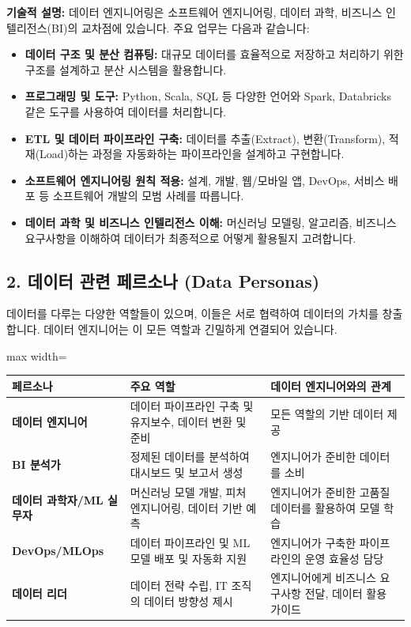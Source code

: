 \documentclass[11pt,a4paper]{article}
\begin{document}
\textbf{기술적 설명:}
데이터 엔지니어링은 소프트웨어 엔지니어링, 데이터 과학, 비즈니스 인텔리전스(BI)의 교차점에 있습니다.
주요 업무는 다음과 같습니다:
\begin{itemize}
    \item \textbf{데이터 구조 및 분산 컴퓨팅:} 대규모 데이터를 효율적으로 저장하고 처리하기 위한 구조를 설계하고 분산 시스템을 활용합니다.
    \item \textbf{프로그래밍 및 도구:} Python, Scala, SQL 등 다양한 언어와 Spark, Databricks 같은 도구를 사용하여 데이터를 처리합니다.
    \item \textbf{ETL 및 데이터 파이프라인 구축:} 데이터를 추출(Extract), 변환(Transform), 적재(Load)하는 과정을 자동화하는 파이프라인을 설계하고 구현합니다.
    \item \textbf{소프트웨어 엔지니어링 원칙 적용:} 설계, 개발, 웹/모바일 앱, DevOps, 서비스 배포 등 소프트웨어 개발의 모범 사례를 따릅니다.
    \item \textbf{데이터 과학 및 비즈니스 인텔리전스 이해:} 머신러닝 모델링, 알고리즘, 비즈니스 요구사항을 이해하여 데이터가 최종적으로 어떻게 활용될지 고려합니다.
\end{itemize}

\subsection*{2. 데이터 관련 페르소나 (Data Personas)}

데이터를 다루는 다양한 역할들이 있으며, 이들은 서로 협력하여 데이터의 가치를 창출합니다. 데이터 엔지니어는 이 모든 역할과 긴밀하게 연결되어 있습니다.

\begin{adjustbox}{max width=\textwidth}
\begin{tabular}{lll}
\toprule
\textbf{페르소나} & \textbf{주요 역할} & \textbf{데이터 엔지니어와의 관계} \\
\midrule
\textbf{데이터 엔지니어} & 데이터 파이프라인 구축 및 유지보수, 데이터 변환 및 준비 & 모든 역할의 기반 데이터 제공 \\
\textbf{BI 분석가} & 정제된 데이터를 분석하여 대시보드 및 보고서 생성 & 엔지니어가 준비한 데이터를 소비 \\
\textbf{데이터 과학자/ML 실무자} & 머신러닝 모델 개발, 피처 엔지니어링, 데이터 기반 예측 & 엔지니어가 준비한 고품질 데이터를 활용하여 모델 학습 \\
\textbf{DevOps/MLOps} & 데이터 파이프라인 및 ML 모델 배포 및 자동화 지원 & 엔지니어가 구축한 파이프라인의 운영 효율성 담당 \\
\textbf{데이터 리더} & 데이터 전략 수립, IT 조직의 데이터 방향성 제시 & 엔지니어에게 비즈니스 요구사항 전달, 데이터 활용 가이드 \\
\bottomrule
\end{tabular}
\end{adjustbox}
\end{document}
